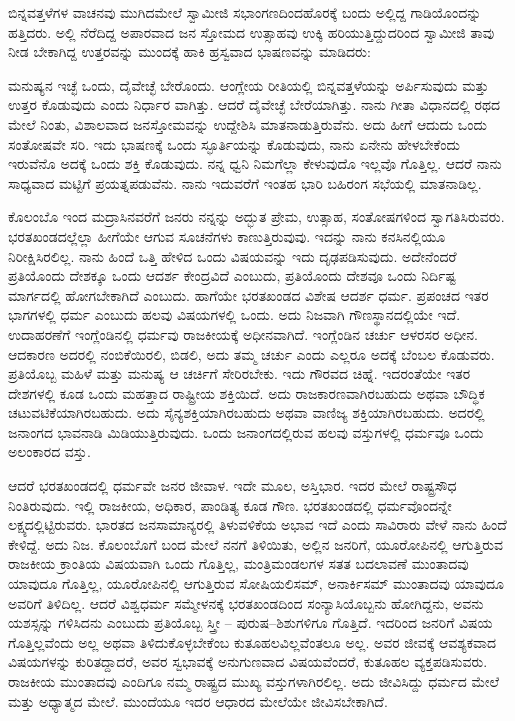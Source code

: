 ಬಿನ್ನವತ್ತಳೆಗಳ ವಾಚನವು ಮುಗಿದಮೇಲೆ ಸ್ವಾಮೀಜಿ ಸಭಾಂಗಣದಿಂದ\break ಹೊರಕ್ಕೆ ಬಂದು ಅಲ್ಲಿದ್ದ ಗಾಡಿಯೊಂದನ್ನು ಹತ್ತಿದರು. ಅಲ್ಲಿ ನೆರೆದಿದ್ದ ಅಪಾರವಾದ ಜನ ಸ್ತೋಮದ ಉತ್ಸಾಹವು ಉಕ್ಕಿ ಹರಿಯುತ್ತಿದ್ದುದರಿಂದ ಸ್ವಾಮೀಜಿ ತಾವು ನೀಡ ಬೇಕಾಗಿದ್ದ ಉತ್ತರವನ್ನು ಮುಂದಕ್ಕೆ ಹಾಕಿ ಹ್ರಸ್ವವಾದ ಭಾಷಣವನ್ನು ಮಾಡಿದರು: 

ಮನುಷ್ಯನ ಇಚ್ಛೆ ಒಂದು, ದೈವೇಚ್ಛೆ ಬೇರೊಂದು. ಆಂಗ್ಲೇಯ ರೀತಿಯಲ್ಲಿ ಬಿನ್ನವತ್ತಳೆಯನ್ನು ಅರ್ಪಿಸುವುದು ಮತ್ತು ಉತ್ತರ ಕೊಡುವುದು ಎಂದು ನಿರ್ಧಾರ ವಾಗಿತ್ತು. ಆದರೆ ದೈವೇಚ್ಛೆ ಬೇರೆಯಾಗಿತ್ತು. ನಾನು ಗೀತಾ ವಿಧಾನದಲ್ಲಿ ರಥದ ಮೇಲೆ ನಿಂತು, ವಿಶಾಲವಾದ ಜನಸ್ತೋಮವನ್ನು ಉದ್ದೇಶಿಸಿ ಮಾತನಾಡುತ್ತಿರುವೆನು. ಅದು ಹೀಗೆ ಆದುದು ಒಂದು ಸಂತೋಷವೇ ಸರಿ. ಇದು ಭಾಷಣಕ್ಕೆ ಒಂದು ಸ್ಫೂರ್ತಿಯನ್ನು ಕೊಡುವುದು, ನಾನು ಏನೇನು ಹೇಳಬೇಕೆಂದು ಇರುವೆನೊ ಅದಕ್ಕೆ ಒಂದು ಶಕ್ತಿ ಕೊಡುವುದು. ನನ್ನ ಧ್ವನಿ ನಿಮಗೆಲ್ಲಾ ಕೇಳುವುದೊ ಇಲ್ಲವೊ ಗೊತ್ತಿಲ್ಲ. ಆದರೆ ನಾನು ಸಾಧ್ಯವಾದ ಮಟ್ಟಿಗೆ ಪ್ರಯತ್ನಪಡುವೆನು. ನಾನು ಇದುವರೆಗೆ ಇಂತಹ ಭಾರಿ ಬಹಿರಂಗ ಸಭೆಯಲ್ಲಿ ಮಾತನಾಡಿಲ್ಲ. 

ಕೊಲಂಬೊ ಇಂದ ಮದ್ರಾಸಿನವರೆಗೆ ಜನರು ನನ್ನನ್ನು ಅದ್ಭುತ ಪ್ರೇಮ, ಉತ್ಸಾಹ, ಸಂತೋಷಗಳಿಂದ ಸ್ವಾಗತಿಸಿರುವರು. ಭರತಖಂಡದಲ್ಲೆಲ್ಲಾ ಹೀಗೆಯೇ ಆಗುವ ಸೂಚನೆಗಳು ಕಾಣುತ್ತಿರುವುವು. ಇದನ್ನು ನಾನು ಕನಸಿನಲ್ಲಿಯೂ ನಿರೀಕ್ಷಿಸಿರಲಿಲ್ಲ. ನಾನು ಹಿಂದೆ ಒತ್ತಿ ಹೇಳಿದ ಒಂದು ವಿಷಯವನ್ನು ಇದು ದೃಢಪಡಿಸುವುದು. ಅದೇನೆಂದರೆ ಪ್ರತಿಯೊಂದು ದೇಶಕ್ಕೂ ಒಂದು ಆದರ್ಶ ಕೇಂದ್ರವಿದೆ ಎಂಬುದು, ಪ್ರತಿಯೊಂದು ದೇಶವೂ ಒಂದು ನಿರ್ದಿಷ್ಟ ಮಾರ್ಗದಲ್ಲಿ ಹೋಗಬೇಕಾಗಿದೆ ಎಂಬುದು. ಹಾಗೆಯೇ ಭರತಖಂಡದ ವಿಶೇಷ ಆದರ್ಶ ಧರ್ಮ. ಪ್ರಪಂಚದ ಇತರ ಭಾಗಗಳಲ್ಲಿ ಧರ್ಮ ಎಂಬುದು ಹಲವು ವಿಷಯಗಳಲ್ಲಿ ಒಂದು. ಅದು ನಿಜವಾಗಿ ಗೌಣಸ್ಥಾನದಲ್ಲಿಯೇ ಇದೆ. ಉದಾಹರಣೆಗೆ ಇಂಗ್ಲೆಂಡಿನಲ್ಲಿ ಧರ್ಮವು ರಾಜಕೀಯಕ್ಕೆ ಅಧೀನವಾಗಿದೆ. ಇಂಗ್ಲೆಂಡಿನ ಚರ್ಚು ಆಳರಸರ ಅಧೀನ. ಆದಕಾರಣ ಅದರಲ್ಲಿ ನಂಬಿಕೆಯಿರಲಿ, ಬಿಡಲಿ, ಅದು ತಮ್ಮ ಚರ್ಚು ಎಂದು ಎಲ್ಲರೂ ಅದಕ್ಕೆ ಬೆಂಬಲ ಕೊಡುವರು. ಪ್ರತಿಯೊಬ್ಬ ಮಹಿಳೆ ಮತ್ತು ಮನುಷ್ಯ ಆ ಚರ್ಚಿಗೆ ಸೇರಿರಬೇಕು. ಇದು ಗೌರವದ ಚಿಹ್ನೆ. ಇದರಂತೆಯೇ ಇತರ ದೇಶಗಳಲ್ಲಿ ಕೂಡ ಒಂದು ಮಹತ್ತಾದ ರಾಷ್ಟ್ರೀಯ ಶಕ್ತಿಯಿದೆ. ಅದು ರಾಜಕಾರಣವಾಗಿರಬಹುದು ಅಥವಾ ಬೌದ್ಧಿಕ ಚಟುವಟಿಕೆಯಾಗಿರಬಹುದು. ಅದು ಸೈನ್ಯಶಕ್ತಿಯಾಗಿರಬಹುದು ಅಥವಾ ವಾಣಿಜ್ಯ ಶಕ್ತಿಯಾಗಿರಬಹುದು. ಅದರಲ್ಲಿ ಜನಾಂಗದ ಭಾವನಾಡಿ ಮಿಡಿಯುತ್ತಿರುವುದು. ಒಂದು ಜನಾಂಗದಲ್ಲಿರುವ ಹಲವು ವಸ್ತುಗಳಲ್ಲಿ ಧರ್ಮವೂ ಒಂದು ಅಲಂಕಾರದ ವಸ್ತು. 

ಆದರೆ ಭರತಖಂಡದಲ್ಲಿ ಧರ್ಮವೇ ಜನರ ಜೀವಾಳ. ಇದೇ ಮೂಲ, ಅಸ್ತಿಭಾರ. ಇದರ ಮೇಲೆ ರಾಷ್ಟ್ರಸೌಧ ನಿಂತಿರುವುದು. ಇಲ್ಲಿ ರಾಜಕೀಯ, ಅಧಿಕಾರ, ಪಾಂಡಿತ್ಯ ಕೂಡ ಗೌಣ. ಭರತಖಂಡದಲ್ಲಿ ಧರ್ಮವೊಂದನ್ನೇ ಲಕ್ಷ್ಯದಲ್ಲಿಟ್ಟಿರುವರು. ಭಾರತದ ಜನಸಾಮಾನ್ಯರಲ್ಲಿ ತಿಳುವಳಿಕೆಯ ಅಭಾವ ಇದೆ ಎಂದು ಸಾವಿರಾರು ವೇಳೆ ನಾನು ಹಿಂದೆ ಕೇಳಿದ್ದೆ. ಅದು ನಿಜ. ಕೊಲಂಬೊಗೆ ಬಂದ ಮೇಲೆ ನನಗೆ ತಿಳಿಯಿತು, ಅಲ್ಲಿನ ಜನರಿಗೆ, ಯೂರೋಪಿನಲ್ಲಿ ಆಗುತ್ತಿರುವ ರಾಜಕೀಯ ಕ್ರಾಂತಿಯ ವಿಷಯವಾಗಿ ಒಂದು ಗೊತ್ತಿಲ್ಲ, ಮಂತ್ರಿಮಂಡಲಗಳ ಸತತ ಬದಲಾವಣೆ ಮುಂತಾದವು ಯಾವುದೂ ಗೊತ್ತಿಲ್ಲ, ಯೂರೋಪಿನಲ್ಲಿ ಆಗುತ್ತಿರುವ ಸೋಷಿಯಲಿಸಮ್​, ಅನಾರ್ಕಿಸಮ್​ ಮುಂತಾದವು ಯಾವುದೂ ಅವರಿಗೆ ತಿಳಿದಿಲ್ಲ. ಆದರೆ ವಿಶ್ವಧರ್ಮ ಸಮ್ಮೇಳನಕ್ಕೆ ಭರತಖಂಡದಿಂದ ಸಂನ್ಯಾಸಿಯೊಬ್ಬನು ಹೋಗಿದ್ದನು, ಅವನು ಯಶಸ್ಸನ್ನು ಗಳಿಸಿದನು ಎಂಬುದು ಪ್ರತಿಯೊಬ್ಬ ಸ್ತ್ರೀ – ಪುರುಷ–ಶಿಶುಗಳಿಗೂ ಗೊತ್ತಿದೆ. ಇದರಿಂದ ಜನರಿಗೆ ವಿಷಯ ಗೊತ್ತಿಲ್ಲವೆಂದು ಅಲ್ಲ ಅಥವಾ ತಿಳಿದುಕೊಳ್ಳಬೇಕೆಂಬ ಕುತೂಹಲವಿಲ್ಲವೆಂತಲೂ ಅಲ್ಲ. ಅವರ ಜೀವಕ್ಕೆ ಆವಶ್ಯಕವಾದ ವಿಷಯಗಳನ್ನು ಕುರಿತದ್ದಾದರೆ, ಅವರ ಸ್ವಭಾವಕ್ಕೆ ಅನುಗುಣವಾದ ವಿಷಯವೆಂದರೆ, ಕುತೂಹಲ ವ್ಯಕ್ತಪಡಿಸುವರು. ರಾಜಕೀಯ ಮುಂತಾದವು ಎಂದಿಗೂ ನಮ್ಮ ರಾಷ್ಟ್ರದ ಮುಖ್ಯ ವಸ್ತುಗಳಾಗಿರಲಿಲ್ಲ. ಅದು ಜೀವಿಸಿದ್ದು ಧರ್ಮದ ಮೇಲೆ ಮತ್ತು ಅಧ್ಯಾತ್ಮದ ಮೇಲೆ. ಮುಂದೆಯೂ ಇದರ ಆಧಾರದ ಮೇಲೆಯೇ ಜೀವಿಸಬೇಕಾಗಿದೆ. 

